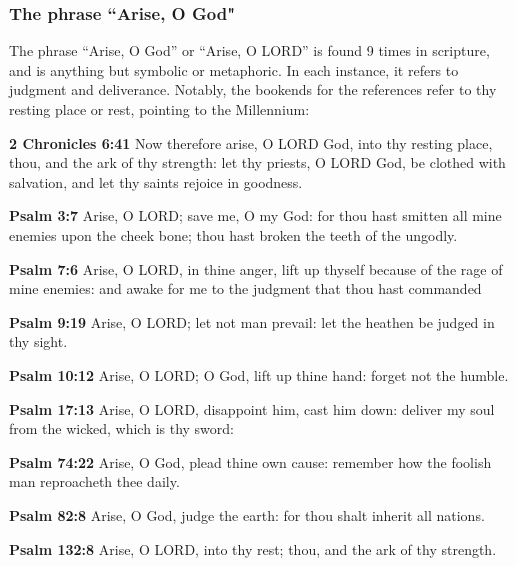\subsubsection{The phrase ``Arise, O God"}
The phrase ``Arise, O God'' or ``Arise, O LORD'' is found 9 times in scripture, and is anything but symbolic or metaphoric. In each instance, it refers to judgment and deliverance. Notably, the bookends for the references refer to thy resting place or rest, pointing to the Millennium:

\begin{compactenum}[1.]
	\item  \textbf{2 Chronicles 6:41} Now therefore arise, O LORD God, into thy resting place, thou, and the ark of thy strength: let thy priests, O LORD God, be clothed with salvation, and let thy saints rejoice in goodness.
	\item \textbf{Psalm 3:7} Arise, O LORD; save me, O my God: for thou hast smitten all mine enemies upon the cheek bone; thou hast broken the teeth of the ungodly.
	\item \textbf{Psalm 7:6} Arise, O LORD, in thine anger, lift up thyself because of the rage of mine enemies: and awake for me to the judgment that thou hast commanded
	\item \textbf{Psalm 9:19}  Arise, O LORD; let not man prevail: let the heathen be judged in thy sight.
	\item \textbf{Psalm 10:12} Arise, O LORD; O God, lift up thine hand: forget not the humble.
	\item \textbf{Psalm 17:13} Arise, O LORD, disappoint him, cast him down: deliver my soul from the wicked, which is thy sword: 
	\item \textbf{Psalm 74:22} Arise, O God, plead thine own cause: remember how the foolish man reproacheth thee daily. 
	\item \textbf{Psalm 82:8}  Arise, O God, judge the earth: for thou shalt inherit all nations.
	\item \textbf{Psalm 132:8} Arise, O LORD, into thy rest; thou, and the ark of thy strength.
\end{compactenum}